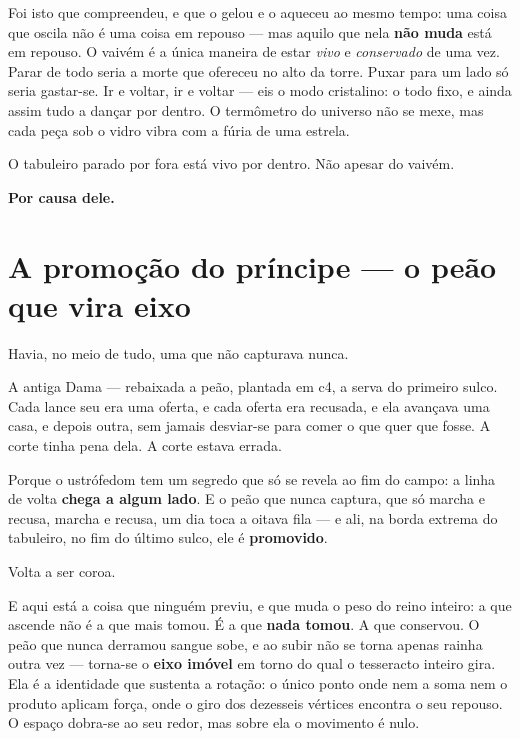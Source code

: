\documentclass[livro.tex]{subfiles}
\begin{document}
Foi isto que \Ben compreendeu, e que o gelou e o aqueceu ao mesmo tempo: uma
coisa que oscila não é uma coisa em repouso --- mas aquilo que nela \textbf{não muda} está
em repouso. O vaivém é a única maneira de estar \emph{vivo} e \emph{conservado} de
uma vez. Parar de todo seria a morte que \Drk ofereceu no alto da torre. Puxar
para um lado só seria gastar-se. Ir e voltar, ir e voltar --- eis o modo cristalino:
o todo fixo, e ainda assim tudo a dançar por dentro. O termômetro do universo
não se mexe, mas cada peça sob o vidro vibra com a fúria de uma estrela.

\medskip

O tabuleiro parado por fora está vivo por dentro. Não apesar do vaivém.

\textbf{Por causa dele.}

\section{A promoção do príncipe --- o peão que vira eixo}

Havia, no meio de tudo, uma que não capturava nunca.

A antiga Dama --- rebaixada a peão, plantada em \textsf{c4}, a serva do primeiro sulco.
Cada lance seu era uma oferta, e cada oferta era recusada, e ela avançava uma casa,
e depois outra, sem jamais desviar-se para comer o que quer que fosse. A corte tinha
pena dela. A corte estava errada.

\medskip

Porque o ustrófedom tem um segredo que só se revela ao fim do campo: a linha de
volta \textbf{chega a algum lado}. E o peão que nunca captura, que só marcha e
recusa, marcha e recusa, um dia toca a oitava fila --- e ali, na borda extrema do
tabuleiro, no fim do último sulco, ele é \textbf{promovido}.

Volta a ser coroa.

\medskip

E aqui está a coisa que ninguém previu, e que muda o peso do reino inteiro: a que
ascende não é a que mais tomou. É a que \textbf{nada tomou}. A que conservou. O peão
que nunca derramou sangue sobe, e ao subir não se torna apenas rainha outra vez ---
torna-se o \textbf{eixo imóvel} em torno do qual o tesseracto inteiro gira. Ela é a
identidade que sustenta a rotação: o único ponto onde nem a soma nem o produto aplicam
força, onde o giro dos dezesseis vértices encontra o seu repouso. O espaço dobra-se ao
seu redor, mas sobre ela o movimento é nulo.
\end{document}
